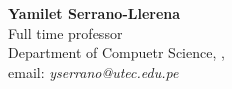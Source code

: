 \noindent \textbf{Yamilet Serrano-Llerena}\\ 
Full time professor \\
Department of Compuetr Science, \University, \city\\
email: \textit{yserrano@utec.edu.pe}\\

